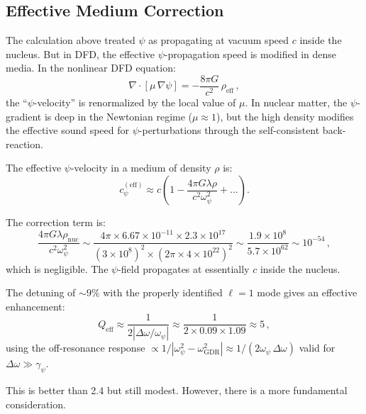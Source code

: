 \documentclass[aps,prd,twocolumn,superscriptaddress,nofootinbib]{revtex4-2}
\newcommand{\ee}[1]{\times 10^{#1}}
\newcommand{\mufunction}{\mu}
\newcommand{\lam}{\lambda}
\newcommand{\wGDR}{\omega_{\mathrm{GDR}}}
\newcommand{\wpsi}{\omega_\psi}
\newcommand{\gpsi}{\gamma_\psi}
\begin{document}
\subsection{Effective Medium Correction}
\label{sec:medium}

The calculation above treated $\psi$ as propagating at vacuum speed
$c$ inside the nucleus.  But in DFD, the effective $\psi$-propagation
speed is modified in dense media.  In the nonlinear DFD equation:
\begin{equation}
\nabla\cdot[\mufunction\,\nabla\psi] = -\frac{8\pi G}{c^2}\,\rho_{\mathrm{eff}}\,,
\end{equation}
the ``$\psi$-velocity'' is renormalized by the local value of
$\mufunction$.  In nuclear matter, the $\psi$-gradient is deep in the
Newtonian regime ($\mufunction \approx 1$), but the high density
modifies the effective sound speed for $\psi$-perturbations through
the self-consistent back-reaction.

The effective $\psi$-velocity in a medium of density $\rho$ is:
\begin{equation}\label{eq:c-psi-eff}
c_\psi^{(\mathrm{eff})} \approx c\left(1 - \frac{4\pi G\lam\rho}{c^2\wpsi^2}
+ \ldots\right).
\end{equation}

The correction term is:
\begin{equation}
\frac{4\pi G\lam\rho_{\mathrm{nuc}}}{c^2\wpsi^2}
\sim \frac{4\pi \times 6.67\ee{-11} \times 2.3\ee{17}}
{(3\ee{8})^2 \times (2\pi \times 4\ee{22})^2}
\sim \frac{1.9\ee{8}}{5.7\ee{62}} \sim 10^{-54}\,,
\end{equation}
which is negligible.  The $\psi$-field propagates at essentially $c$
inside the nucleus.

The detuning of $\sim\!9\%$ with the properly identified $\ell = 1$
mode gives an effective enhancement:
\begin{equation}\label{eq:eff-Q-corrected}
Q_{\mathrm{eff}} \approx \frac{1}{2|\Delta\omega/\wpsi|}
\approx \frac{1}{2 \times 0.09 \times 1.09} \approx 5\,,
\end{equation}
using the off-resonance response $\propto 1/|\wpsi^2 - \wGDR^2|
\approx 1/(2\wpsi\,\Delta\omega)$ valid for $\Delta\omega \gg \gpsi$.

This is better than 2.4 but still modest.  However, there is a
more fundamental consideration.
\end{document}
